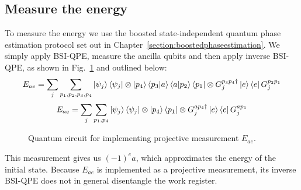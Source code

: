 \subsection{Measure the energy}
\label{section:energymeasurement}
To measure the energy we use the boosted state-independent quantum phase estimation protocol set out in Chapter~\ref{section:boostedphaseestimation}. We simply apply BSI-QPE, measure the ancilla qubits and then apply inverse BSI-QPE, as shown in Fig.~\ref{fig:Ecircuit} and outlined below:
\begin{equation}
    E_{ae} = \sum_j\sum_{p_1,p_2,p_3,p_4} \ket{\psi_j}\bra{\psi_j} \otimes \ket{p_4}\braket{p_3|a}\braket{a|p_2}\bra{p_1} \otimes G_j^{p_3p_4 \dagger}\ket{e}\bra{e}G_j^{p_2p_1}
\end{equation}
\begin{equation}
        E_{ae} = \sum_j\sum_{p_1,p_4} \ket{\psi_j}\bra{\psi_j}\otimes\ket{p_4}\bra{p_1}\otimes
        G_j^{ap_4 \dagger}\ket{e}\bra{e}G_j^{ap_1}
\end{equation}
\begin{figure}[htbp]
    \centering
{}

\caption{Quantum circuit for implementing projective measurement $E_{ae}$.}
\label{fig:Ecircuit}
\end{figure}
This measurement gives us $(-1)^ea$, which approximates the energy of the initial state. Because $E_{ae}$ is implemented as a projective measurement, its inverse BSI-QPE does not in general disentangle the work register. 
